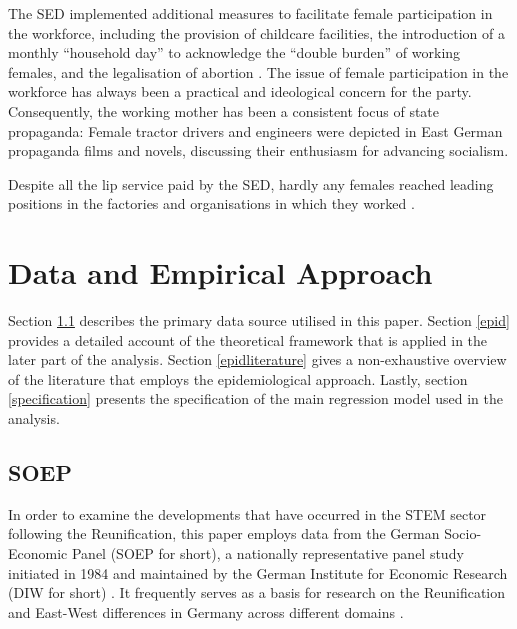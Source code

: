 \documentclass[a4paper, oneside, hyperfootnotes = false]{article}
\begin{document}
{%
The SED implemented additional measures to facilitate female participation in the workforce, including the provision of childcare facilities, the introduction of a monthly ``household day'' to acknowledge the ``double burden'' of working females, and the legalisation of abortion \citep{Budde1999}.
The issue of female participation in the workforce has always been a practical and ideological concern for the party.
Consequently, the working mother has been a consistent focus of state propaganda:
Female tractor drivers and engineers were depicted in East German propaganda films and novels, discussing their enthusiasm for advancing socialism.

Despite all the lip service paid by the SED, hardly any females reached leading positions in the factories and organisations in which they worked \citep{Ross2017, Frauenreport1990}.

\section{Data and Empirical Approach}
\label{dataemp}

Section \ref{gsoep} describes the primary data source utilised in this paper.
Section \ref{epid} provides a detailed account of the theoretical framework that is applied in the later part of the analysis.
Section \ref{epidliterature} gives a non-exhaustive overview of the literature that employs the epidemiological approach.
Lastly, section \ref{specification} presents the specification of the main regression model used in the analysis.

\subsection{SOEP}
\label{gsoep}

In order to examine the developments that have occurred in the STEM sector following the Reunification, this paper employs data from the German Socio-Economic Panel (SOEP for short), a nationally representative panel study initiated in 1984 and maintained by the German Institute for Economic Research (DIW for short) \citep{Siegers2022}.
It frequently serves as a basis for research on the Reunification and East-West differences in Germany across different domains \citep{Petrunyk2016, Bird1994, Hadjar2010}.

}
\end{document}
